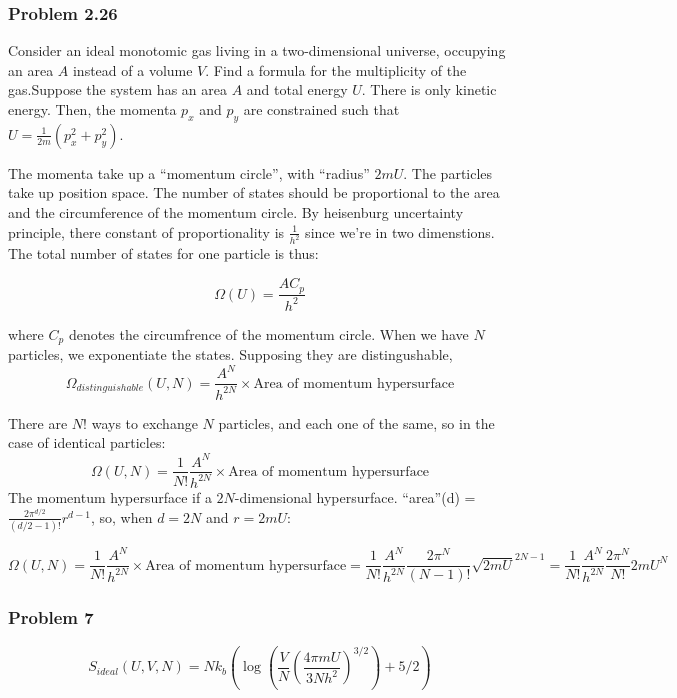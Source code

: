 \documentclass[letterpaper,10pt,english]{/usr/local/lib/python2.7/dist-packages/sphinx/texinputs/sphinxhowto}
\begin{document}
        
    
\subsubsection{Problem 2.26}Consider an ideal monotomic gas living in a two-dimensional universe,
occupying an area \(A\) instead of a volume \(V\). Find a formula for
the multiplicity of the gas.Suppose the system has an area \(A\) and total energy \(U\). There is
only kinetic energy. Then, the momenta \(p_x\) and \(p_y\) are
constrained such that \(U = \frac{1}{2m} \left( p_x^2 + p_y^2 \right)\).

The momenta take up a ``momentum circle'', with ``radius'' \(2mU\). The
particles take up position space. The number of states should be
proportional to the area and the circumference of the momentum circle.
By heisenburg uncertainty principle, there constant of proportionality
is \(\frac{1}{h^2}\) since we're in two dimenstions. The total number of
states for one particle is thus:

\[
\Omega(U)
=
\frac{A C_p}{h^2}
\]

where \(C_p\) denotes the circumfrence of the momentum circle. When we
have \(N\) particles, we exponentiate the states. Supposing they are
distingushable, \[
\Omega_{distinguishable}(U,N)
=
\frac{A^N}{h^{2N}} \times {\text{Area of momentum hypersurface}}
\]

There are \(N!\) ways to exchange \(N\) particles, and each one of the
same, so in the case of identical particles: \[
\Omega(U,N)
=
\frac{1}{N!} \frac{A^N}{h^{2N}}  \times {\text{Area of momentum hypersurface}}
\]The momentum hypersurface if a \(2N\)-dimensional hypersurface.
``area''(d) = \(\frac{2 \pi^{d/2}}{(d/2 - 1)!} r^{d-1}\), so, when
\(d = 2N\) and \(r = 2mU\):

\[
\Omega(U,N)
=
\frac{1}{N!} \frac{A^N}{h^{2N}}  \times {\text{Area of momentum hypersurface}}
=
\frac{1}{N!} \frac{A^N}{h^{2N}} \frac{2 \pi^{N}}{(N - 1)!} {\sqrt{2mU}}^{2N-1}
=
\frac{1}{N!} \frac{A^N}{h^{2N}} \frac{2 \pi^{N}}{N!} {2mU}^{N}
\]\subsubsection{Problem 7}\[
S_{ideal}(U,V,N) = N k_b \left( \log \left( \frac{V}{N} \left( \frac{4 \pi m U}{3 N h^2} \right)^{3/2} \right) + 5/2 \right)
\]

\end{document}
